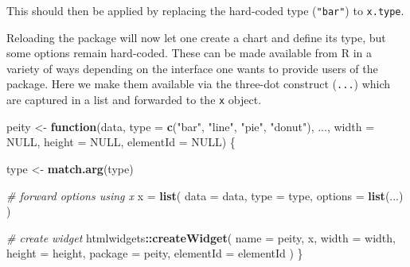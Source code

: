 \documentclass[
]{krantz}
\makeatletter
\newenvironment{Shaded}{\begin{snugshade}}{\end{snugshade}}
\newcommand{\AttributeTok}[1]{\textcolor[rgb]{0.61,0.61,0.61}{#1}}
\newcommand{\CommentTok}[1]{\textcolor[rgb]{0.37,0.37,0.37}{\textit{#1}}}
\newcommand{\ControlFlowTok}[1]{\textcolor[rgb]{0.27,0.27,0.27}{\textbf{#1}}}
\newcommand{\DataTypeTok}[1]{\textcolor[rgb]{0.27,0.27,0.27}{#1}}
\newcommand{\KeywordTok}[1]{\textcolor[rgb]{0.27,0.27,0.27}{\textbf{#1}}}
\newcommand{\NormalTok}[1]{#1}
\newcommand{\OperatorTok}[1]{\textcolor[rgb]{0.43,0.43,0.43}{\textbf{#1}}}
\newcommand{\OtherTok}[1]{\textcolor[rgb]{0.37,0.37,0.37}{#1}}
\newcommand{\StringTok}[1]{\textcolor[rgb]{0.5,0.5,0.5}{#1}}
\newcommand{\VariableTok}[1]{\textcolor[rgb]{0,0,0}{#1}}
\newenvironment{kframe}{%
\medskip{}
\setlength{\fboxsep}{.8em}
 \def\at@end@of@kframe{}%
 \ifinner\ifhmode%
  \def\at@end@of@kframe{\end{minipage}}%
  \begin{minipage}{\columnwidth}%
 \fi\fi%
 \def\FrameCommand##1{\hskip\@totalleftmargin \hskip-\fboxsep
 \colorbox{shadecolor}{##1}\hskip-\fboxsep
     \hskip-\linewidth \hskip-\@totalleftmargin \hskip\columnwidth}%
 \MakeFramed {\advance\hsize-\width
   \@totalleftmargin\z@ \linewidth\hsize
   \@setminipage}}%
 {\par\unskip\endMakeFramed%
 \at@end@of@kframe}
\renewenvironment{Shaded}{\begin{kframe}}{\end{kframe}}
\makeatother
\begin{document}
This should then be applied by replacing the hard-coded type (\texttt{"bar"}) to \texttt{x.type}.

\begin{Shaded}
\end{Shaded}

Reloading the package will now let one create a chart and define its type, but some options remain hard-coded. These can be made available from R in a variety of ways depending on the interface one wants to provide users of the package. Here we make them available via the three-dot construct (\texttt{...}) which are captured in a list and forwarded to the \texttt{x} object.

\begin{Shaded}
\begin{Highlighting}[]
\NormalTok{peity <{-}}\StringTok{ }\ControlFlowTok{function}\NormalTok{(data, }\DataTypeTok{type =} \KeywordTok{c}\NormalTok{(}\StringTok{"bar"}\NormalTok{, }\StringTok{"line"}\NormalTok{, }\StringTok{"pie"}\NormalTok{, }\StringTok{"donut"}\NormalTok{), ...,}
  \DataTypeTok{width =} \OtherTok{NULL}\NormalTok{, }\DataTypeTok{height =} \OtherTok{NULL}\NormalTok{, }\DataTypeTok{elementId =} \OtherTok{NULL}\NormalTok{) \{}

\NormalTok{  type <{-}}\StringTok{ }\KeywordTok{match.arg}\NormalTok{(type)}

  \CommentTok{\# forward options using x}
\NormalTok{  x =}\StringTok{ }\KeywordTok{list}\NormalTok{(}
    \DataTypeTok{data =}\NormalTok{ data,}
    \DataTypeTok{type =}\NormalTok{ type,}
    \DataTypeTok{options =} \KeywordTok{list}\NormalTok{(...)}
\NormalTok{  )}

  \CommentTok{\# create widget}
\NormalTok{  htmlwidgets}\OperatorTok{::}\KeywordTok{createWidget}\NormalTok{(}
    \DataTypeTok{name =} \StringTok{\textquotesingle{}peity\textquotesingle{}}\NormalTok{,}
\NormalTok{    x,}
    \DataTypeTok{width =}\NormalTok{ width,}
    \DataTypeTok{height =}\NormalTok{ height,}
    \DataTypeTok{package =} \StringTok{\textquotesingle{}peity\textquotesingle{}}\NormalTok{,}
    \DataTypeTok{elementId =}\NormalTok{ elementId}
\NormalTok{  )}
\NormalTok{\}}
\end{Highlighting}
\end{Shaded}
\end{document}
